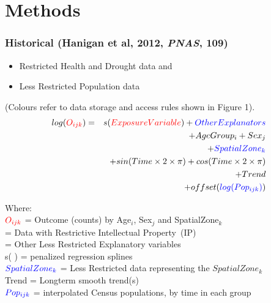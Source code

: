 \documentclass[bigger]{beamer}
\begin{document}
\section{Methods}
\label{sec-2}
\begin{frame}
\frametitle{Historical (Hanigan et al, 2012, \emph{PNAS}, 109)}
\label{sec-2-1}

\begin{footnotesize}
\begin{itemize}
\item {\color{red}Restricted Health and Drought data} and 
\item {\color{blue}Less Restricted Population data} 
\end{itemize}
(Colours refer to data storage and access rules shown in Figure 1).
\begin{eqnarray*}
        log({\color{red} O_{ijk}})  & = & s({\color{red}ExposureVariable})  + {\color{blue} OtherExplanators}  \\
        & &   + AgeGroup_{i} + Sex_{j} \\
        & &   + {\color{blue} SpatialZone_{k}}  \\
        & &  + sin(Time \times 2 \times \pi) + cos(Time \times 2 \times \pi) \\
        & &  + Trend \\
        & &   + offset({\color{blue} log(Pop_{ijk})})\\
\end{eqnarray*}
\end{footnotesize}
\begin{tiny}
\noindent Where:\\
        \indent ${\color{red}O_{ijk}}$ = Outcome (counts) by Age$_{i}$, Sex$_{j}$ and SpatialZone$_{k}$ \\
         = Data with {\color{red}Restrictive Intellectual Property~(IP)} \\
         = Other {\color{blue}Less Restricted}  Explanatory variables \\
        \indent s( ) = penalized regression splines \\
        \indent ${\color{blue} SpatialZone_{k}}$  = {\color{blue} Less Restricted} data representing the $SpatialZone_{k}$  \\
        \indent Trend = Longterm smooth trend(s) \\
        \indent ${\color{blue}Pop_{ijk}}$ = interpolated Census populations, by time in each group\\
\end{tiny}
\end{frame}
\end{document}
